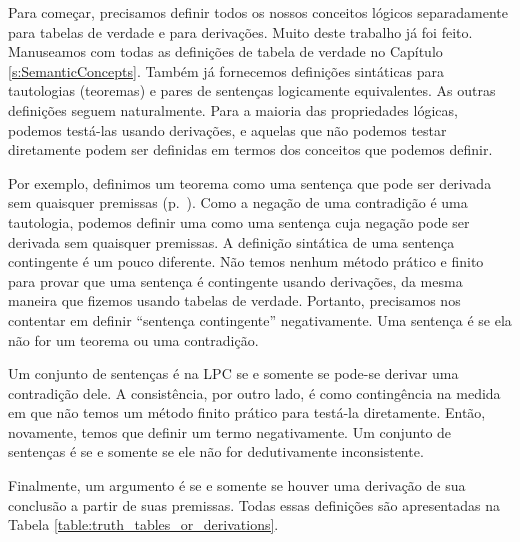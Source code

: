 Para começar, precisamos definir todos os nossos conceitos lógicos separadamente para tabelas de verdade e  para derivações. Muito deste trabalho já foi feito.  Manuseamos com todas as definições de tabela de verdade no Capítulo \ref{s:SemanticConcepts}. Também já fornecemos definições sintáticas para tautologias (teoremas) e pares de sentenças logicamente equivalentes. As outras definições seguem naturalmente. Para a maioria das propriedades lógicas, podemos testá-las usando derivações, e aquelas que não podemos testar diretamente podem ser definidas em termos dos conceitos que podemos definir.

Por exemplo, definimos um teorema como uma sentença que pode ser derivada sem quaisquer premissas (p.~\pageref{def:syntactic_tautology_in_sl}). Como a negação de uma contradição é uma tautologia, podemos definir uma  \label{def:syntactic_contradiction_in_sl} como uma sentença cuja negação pode ser derivada sem quaisquer premissas. A definição sintática de uma sentença contingente é um pouco diferente. Não temos nenhum método prático e finito para provar que uma sentença é contingente usando derivações, da mesma maneira que fizemos usando tabelas de verdade. Portanto, precisamos nos contentar em definir ``sentença contingente'' negativamente. Uma sentença é  \label{def:syntactically_contingent_in_sl} se ela  não for um teorema ou uma contradição. 
 

Um  conjunto de sentenças é  na LPC \label{def:syntactically_inconsistent_ in_sl}  se e somente se pode-se derivar uma contradição dele. A consistência, por outro lado, é como contingência na medida em que não temos um método finito prático para testá-la diretamente. Então, novamente, temos que definir um termo negativamente. Um  conjunto de sentenças é  \label{def:syntactically consistent in SL} se e somente se ele não for dedutivamente inconsistente.
    
Finalmente, um argumento é   \label{def:syntactically_valid_in_SL}se e somente se houver uma derivação de sua conclusão a partir de suas premissas. Todas essas definições são apresentadas na Tabela \ref{table:truth_tables_or_derivations}.

